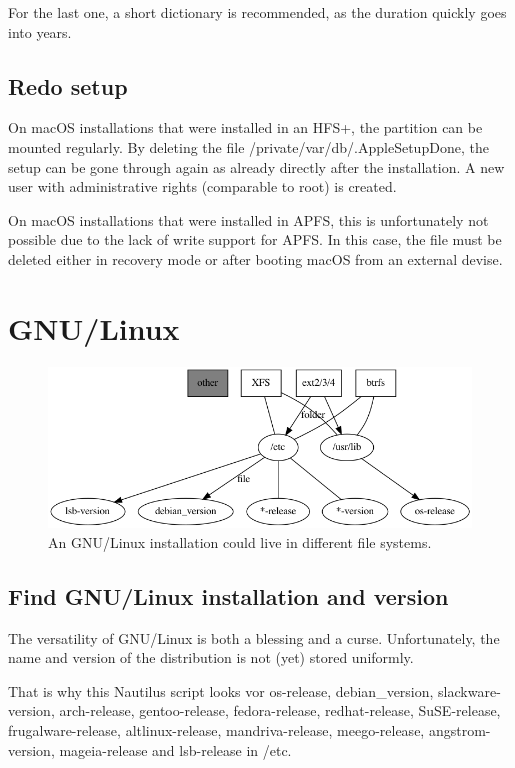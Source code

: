 For the last one, a short dictionary is recommended, as the duration quickly goes into years.

\subsection{Redo setup}

On macOS installations that were installed in an HFS+, the partition can be mounted regularly. By deleting the file /private/var/db/.AppleSetupDone, the setup can be gone through again as already directly after the installation. A new user with administrative rights (comparable to root) is created.

On macOS installations that were installed in APFS, this is unfortunately not possible due to the lack of write support for APFS. In this case, the file must be deleted either in recovery mode or after booting macOS from an external devise.

\section{GNU/Linux}

\begin{figure}[htbp]  %
  \centering
  \includegraphics[width=.5\textwidth]{figures/fs-to-Linux.png}
  \caption[File systems and GNU/Linux]{An GNU/Linux installation could live in different file systems.}
  \label{fig:fs-lin}
\end{figure}

\subsection{Find GNU/Linux installation and version}

The versatility of GNU/Linux is both a blessing and a curse. Unfortunately, the name and version of the distribution is not (yet) stored uniformly.

That is why this Nautilus script looks vor
os-release,
debian\_version,
slackware-version,
arch-release,
gentoo-release,
fedora-release,
redhat-release,
SuSE-release,
frugalware-release,
altlinux-release,
mandriva-release,
meego-release,
angstrom-version,
mageia-release and
lsb-release
in /etc.

